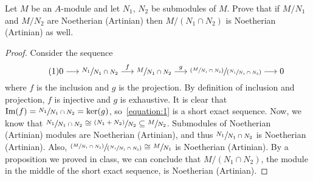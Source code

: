 \begin{problem}
    Let $M$ be an $A$-module and let $N_1$, $N_2$ be submodules of $M$.
    Prove that if $M/N_1$ and $M/N_2$ are Noetherian (Artinian) then $M/(N_1 \cap N_2)$ is Noetherian (Artinian) as well.
    \begin{sol}
        \begin{proof}
            Consider the sequence
            \[ \label{equation:1} \tag{1}
                0 \longrightarrow \sfrac{N_1}{N_1 \cap N_2} \overset{f}{\longrightarrow}
                \sfrac{M}{N_1 \cap N_2}
                \overset{g}{\longrightarrow}
                \sfrac{(\sfrac{M}{N_1 \cap N_2})}{(\sfrac{N_1}{N_1 \cap N_2})}
                \longrightarrow 0
            \]
            where $f$ is the inclusion and $g$ is the projection.
            By definition of inclusion and projection, $f$ is injective and $g$ is exhaustive.
            It is clear that $\text{Im}(f) = \sfrac{N_1}{N_1 \cap N_2} = \ker(g)$,
            so~\eqref{equation:1} is a short exact sequence.
            Now, we know that $\sfrac{N_1}{N_1 \cap N_2} \cong \sfrac{(N_1 + N_2)}{N_2} \subseteq \sfrac{M}{N_2}$.
            Submodules of Noetherian (Artinian) modules are Noetherian (Artinian),
            and thus $\sfrac{N_1}{N_1 \cap N_2}$ is Noetherian (Artinian).
            Also, $\sfrac{(\sfrac{M}{N_1 \cap N_2})}{(\sfrac{N_1}{N_1 \cap N_2})} \cong \sfrac{M}{N_1}$ is Noetherian (Artinian).
            By a proposition we proved in class, we can conclude that $M/(N_1 \cap N_2)$, the module in the middle of the short exact sequence,
            is Noetherian (Artinian).
        \end{proof}
    \end{sol}
\end{problem}